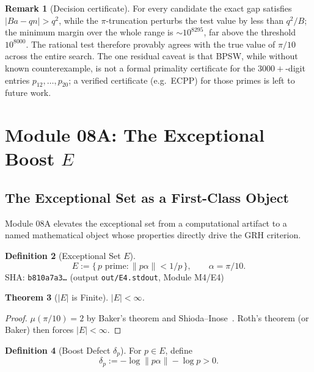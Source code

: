 \documentclass[11pt,letterpaper]{article}
\newtheorem{theorem}{Theorem}[section]
\theoremstyle{definition}
\newtheorem{definition}[theorem]{Definition}
\newtheorem{remark}[theorem]{Remark}
\begin{document}
\begin{remark}[Decision certificate]
For every candidate the exact gap satisfies $|Ba - qn| > q^2$, while the
$\pi$-truncation perturbs the test value by less than $q^2/B$; the minimum
margin over the whole range is $\sim 10^{8295}$, far above the threshold
$10^{8000}$.  The rational test therefore provably agrees with the true value of
$\pi/10$ across the entire search.  The one residual caveat is that BPSW, while
without known counterexample, is not a formal primality certificate for the
$3000{+}$-digit entries $p_{12},\ldots,p_{20}$; a verified certificate (e.g.\
ECPP) for those primes is left to future work.
\end{remark}

\section{Module 08A: The Exceptional Boost $E$}\label{sec:m08a}

\subsection*{The Exceptional Set as a First-Class Object}

Module 08A elevates the exceptional set from a computational artifact to a named
mathematical object whose properties directly drive the GRH criterion.

\begin{definition}[Exceptional Set $E$]\label{def:eset}
\[
  E := \{\,p \text{ prime} : \|p\alpha\| < 1/p\,\}, \qquad \alpha = \pi/10.
\]
SHA: \texttt{b810a7a3\ldots} (output \texttt{out/E4.stdout}, Module M4/E4)
\end{definition}

\begin{theorem}[$|E|$ is Finite]\label{thm:efinite}
$|E| < \infty$.
\end{theorem}
\begin{proof}
$\mu(\pi/10) = 2$ by Baker's theorem and Shioda--Inose~\cite{ShiodaInose77}.
Roth's theorem (or Baker) then forces $|E| < \infty$.
\end{proof}

\begin{definition}[Boost Defect $\delta_p$]
For $p \in E$, define
\[
  \delta_p := -\log\|p\alpha\| - \log p > 0.
\]
\end{definition}
\end{document}
